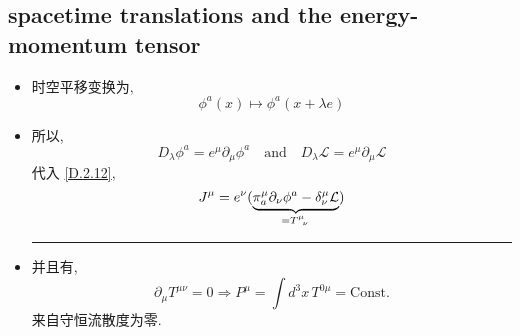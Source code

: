 \subsection{spacetime translations and the energy-momentum tensor}
\begin{itemize}
	\item 时空平移变换为,
	\begin{equation}
		\phi^a(x) \mapsto \phi^a(x + \lambda e)
	\end{equation}
	
	\item 所以,
	\begin{equation}
		D_\lambda \phi^a = e^\mu \partial_\mu \phi^a \quad \text{and} \quad D_\lambda \mathcal{L} = e^\mu \partial_\mu \mathcal{L}
	\end{equation}
	代入 \eqref{D.2.12},
	\begin{equation}
		J^\mu = e^\nu (\underbrace{\pi_a^\mu \partial_\nu \phi^a - \delta^\mu_\nu \mathcal{L}}_{= \tensor{T}{^\mu_\nu}})
	\end{equation}
	
	\noindent\rule[0.5ex]{\linewidth}{0.5pt} %
	
	\item 并且有,
	\begin{equation} \label{D.2.19}
		\partial_\mu T^{\mu \nu} = 0 \Longrightarrow P^\mu = \int d^3 x \, T^{0 \mu} = \text{Const.}
	\end{equation}
	来自守恒流散度为零.
\end{itemize}

